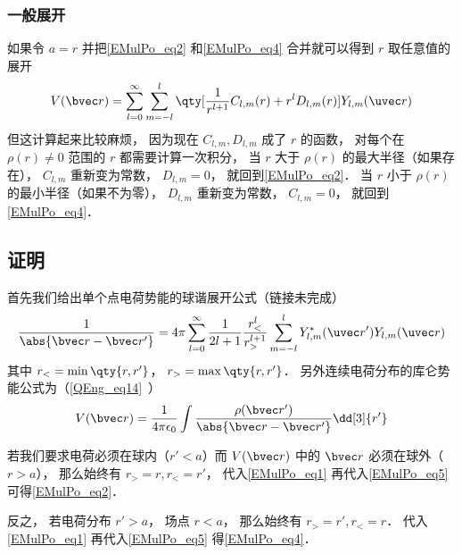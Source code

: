 \subsubsection{一般展开}
如果令 $a = r$ 并把\autoref{EMulPo_eq2} 和\autoref{EMulPo_eq4} 合并就可以得到 $r$ 取任意值的展开
\begin{equation}
V(\bvec r) = \sum_{l = 0}^\infty\sum_{m = -l}^l \qty[\frac{1}{r^{l+1}} C_{l,m}(r) + r^l D_{l,m}(r)] Y_{l,m}(\uvec r)
\end{equation}
但这计算起来比较麻烦， 因为现在 $C_{l,m}, D_{l,m}$ 成了 $r$ 的函数， 对每个在 $\rho(r)\ne 0$ 范围的 $r$ 都需要计算一次积分， 当 $r$ 大于 $\rho(r)$ 的最大半径（如果存在）， $C_{l,m}$ 重新变为常数， $D_{l,m}= 0$， 就回到\autoref{EMulPo_eq2}． 当 $r$ 小于 $\rho(r)$ 的最小半径（如果不为零）， $D_{l,m}$ 重新变为常数， $C_{l,m} = 0$， 就回到\autoref{EMulPo_eq4}．

\subsection{证明}
首先我们给出单个点电荷势能的球谐展开公式（链接未完成）
\begin{equation}\label{EMulPo_eq1}
\frac{1}{\abs{\bvec r - \bvec r'}} = 4\pi \sum_{l=0}^{\infty} \frac{1}{2l+1} \frac{r_<^l}{r_>^{l+1}} \sum_{m = -l}^l Y_{l,m}^*(\uvec r') Y_{l,m}(\uvec r)
\end{equation}
其中 $r_< = \min\qty{r, r'}$， $r_> = \max\qty{r, r'}$． 另外连续电荷分布的库仑势能公式为（\autoref{QEng_eq14}~）
\begin{equation}\label{EMulPo_eq5}
V(\bvec r) = \frac{1}{4\pi\epsilon_0}\int \frac{\rho(\bvec r')}{\abs{\bvec r - \bvec r'}} \dd[3]{r'}
\end{equation}

若我们要求电荷必须在球内（$r' < a$）而 $V(\bvec r)$ 中的 $\bvec r$ 必须在球外（$r > a$）， 那么始终有 $r_> = r, r_< = r'$， 代入\autoref{EMulPo_eq1} 再代入\autoref{EMulPo_eq5} 可得\autoref{EMulPo_eq2}．

反之， 若电荷分布 $r' > a$， 场点 $r < a$， 那么始终有 $r_> = r', r_< = r$． 代入\autoref{EMulPo_eq1} 再代入\autoref{EMulPo_eq5} 得\autoref{EMulPo_eq4}．
